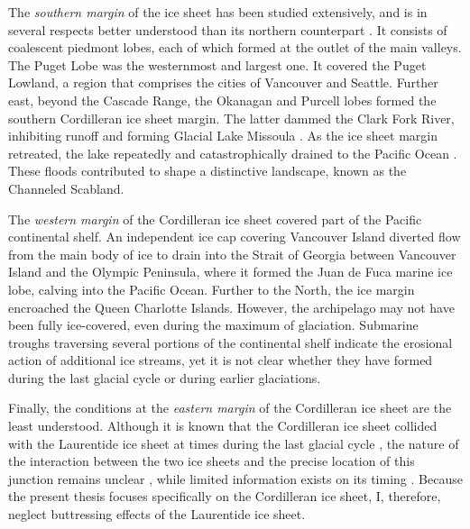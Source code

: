 \documentclass{article}
\newcommand{\todo}[1]{} %
\begin{document}
The \emph{southern margin} of the ice sheet has been studied extensively, and
is in several respects better understood than its northern counterpart
\citep{Booth.etal.2003}. It consists of coalescent piedmont lobes, each of
which formed at the outlet of the main valleys. The Puget Lobe
\citep{Thorson.1980, Porter.Swanson.1998} was the westernmost and largest one.
It covered the Puget Lowland, a region that comprises the cities of Vancouver
and Seattle. Further east, beyond the Cascade Range, the Okanagan and Purcell
lobes formed the southern Cordilleran ice sheet margin. The latter dammed
the Clark Fork River, inhibiting runoff and forming Glacial Lake Missoula
\citep{Pardee.1910}. As the ice sheet margin retreated, the lake repeatedly and
catastrophically drained to the Pacific Ocean \citep{Bretz.1923,Waitt.1980}.
These floods contributed to shape a distinctive landscape, known as the
Channeled Scabland.

The \emph{western margin} of the Cordilleran ice sheet covered part of the
Pacific continental shelf. An independent ice cap covering Vancouver Island
diverted flow from the main body of ice to drain into the Strait of Georgia
between Vancouver Island and the Olympic Peninsula, where it formed the Juan
de Fuca marine ice lobe, calving into the Pacific Ocean. Further to the
North, the ice margin encroached the Queen Charlotte Islands. However, the
archipelago may not have been fully ice-covered, even during the maximum of
glaciation. Submarine troughs traversing several portions of the continental
shelf indicate the erosional action of additional ice streams, yet it is not
clear whether they have formed during the last glacial cycle or during earlier
glaciations.

\todo{Find refs for marine extent of the ice sheet}

Finally, the conditions at the \emph{eastern margin} of the Cordilleran ice
sheet are the least understood. Although it is known that the Cordilleran ice
sheet collided with the Laurentide ice sheet at times during the last glacial
cycle \citep[e.g.][]{Margold.etal.2013, Margold.etal.2013a}, the nature of the
interaction between the two ice sheets and the precise location of this
junction remains unclear \citep{Gowan.2013}, while limited information exists
on its timing \citep[e.g.][]{Jackson.etal.1997, Bednarski.Smith.2007}. Because
the present thesis focuses specifically on the Cordilleran ice sheet, I,
therefore, neglect buttressing effects of the Laurentide ice sheet.
\end{document}
